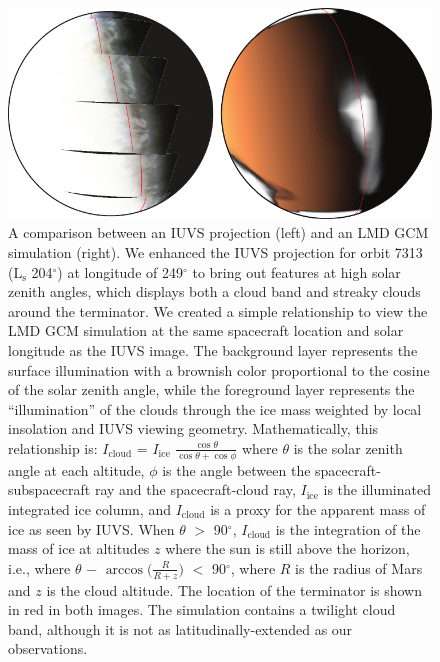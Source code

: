 \documentclass[draft]{agujournal2019}
\begin{document}
\begin{figure}[ht!]
    \centerline{\includegraphics[width=\textwidth]{data_model_comparison.pdf}}
    \caption{A comparison between an IUVS projection (left) and an LMD GCM simulation (right). We enhanced the IUVS projection for orbit 7313 ($\mathrm{L_s}$ 204$^\circ$) at longitude of 249$^\circ$ to bring out features at high solar zenith angles, which displays both a cloud band and streaky clouds around the terminator. We created a simple relationship to view the LMD GCM simulation at the same spacecraft location and solar longitude as the IUVS image. The background layer represents the surface illumination with a brownish color proportional to the cosine of the solar zenith angle, while the foreground layer represents the ``illumination'' of the clouds through the ice mass weighted by local insolation and IUVS viewing geometry. Mathematically, this relationship is: $I_\mathrm{cloud}$ = $I_\mathrm{ice}$ $\frac{\cos \theta}{\cos \theta + \cos \phi}$ where $\theta$ is the solar zenith angle at each altitude, $\phi$ is the angle between the spacecraft-subspacecraft ray and the spacecraft-cloud ray, $I_\mathrm{ice}$ is the illuminated integrated ice column, and $I_\mathrm{cloud}$ is a proxy for the apparent mass of ice as seen by IUVS. When $\theta$ $>$ 90$^\circ$, $I_\mathrm{cloud}$ is the integration of the mass of ice at altitudes $z$ where the sun is still above the horizon, i.e., where $\theta$ $-$ $\arccos \big( \frac{R}{R+z} \big)$ $<$ 90$^\circ$, where $R$ is the radius of Mars and $z$ is the cloud altitude. The location of the terminator is shown in red in both images. The simulation contains a twilight cloud band, although it is not as latitudinally-extended as our observations.
    }
    \label{data_model}
\end{figure}
\end{document}
